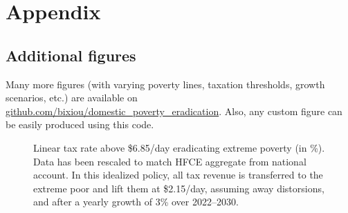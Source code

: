 \documentclass[12pt,english]{article}
\begin{document}
\clearpage
\listoftables
\listoffigures

\appendix %
\renewcommand{\thetable}{A\arabic{table}}
\renewcommand{\thefigure}{A\arabic{figure}}
\setcounter{figure}{0}
\setcounter{table}{0}

\clearpage
\section{Appendix}
\subsection{Additional figures}

Many more figures (with varying poverty lines, taxation thresholds, growth scenarios, etc.) are available on \href{https://github.com/bixiou/domestic_poverty_eradication/tree/main/figures}{github.com/bixiou/domestic\_poverty\_eradication}. Also, any custom figure can be easily produced using this code.



\begin{figure}[!htb]
  \caption[Anti-extreme-poverty tax above \$6.85/day after 3\% growth (HFCE-scaled).]{Linear tax rate above \$6.85/day eradicating extreme poverty (in \%). Data has been rescaled to match HFCE aggregate from national account. In this idealized policy, all tax revenue is transferred to the extreme poor and lift them at \$2.15/day, assuming away distorsions, and after a yearly growth of 3\% over 2022--2030. 
  }\label{fig:s_antipoverty_2_tax_7_average}
\end{figure}
\end{document}
